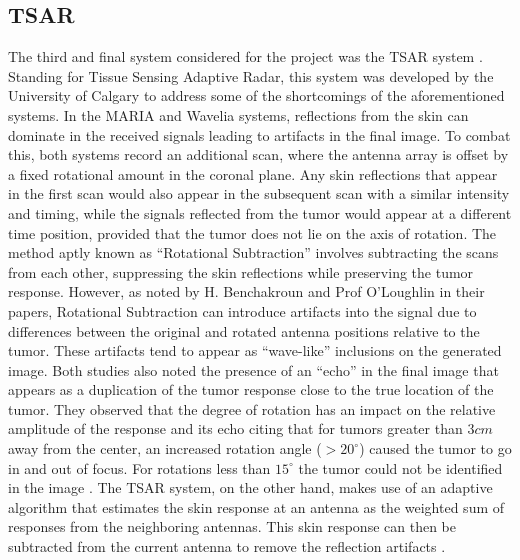 \subsection{TSAR}
The third and final system considered for the project was the TSAR system \cite{e.c.fearMicrowaveBreastImaging2013}.
Standing for Tissue Sensing Adaptive Radar, this system was developed by the University of Calgary to address some of
the shortcomings of the aforementioned systems. In the MARIA and Wavelia systems, reflections from the skin can dominate
in the received signals leading to artifacts in the final image. To combat this, both systems record an additional scan,
where the antenna array is offset by a fixed rotational amount in the coronal plane. Any skin reflections that appear in
the first scan would also appear in the subsequent scan with a similar intensity and timing, while the signals reflected
from the tumor would appear at a different time position, provided that the tumor does not lie on the axis of rotation.
The method aptly known as ``Rotational Subtraction'' involves subtracting the scans from each other, suppressing the skin
reflections while preserving the tumor response. However, as noted by H. Benchakroun and Prof O'Loughlin in their
papers, Rotational Subtraction can introduce artifacts into the signal due to differences between the original and
rotated antenna positions relative to the tumor. These artifacts tend to appear as ``wave-like'' inclusions on the
generated image. Both studies also noted the presence of an ``echo'' in the final image that appears as a duplication of
the tumor response close to the true location of the tumor. They observed that the degree of rotation has an impact on
the relative amplitude of the response and its echo citing that for tumors greater than $3cm$ away from the center, an
increased rotation angle ($ > 20^{\circ}$) caused the tumor to go in and out of focus. For rotations less than
$15^{\circ}$ the tumor could not be identified in the image \cite{h.benchakrounImpactRotationalArtefact2021,
d.oloughlinRotationalArtefactRemoval2020}. The TSAR system, on the other hand, makes use of an adaptive
algorithm that estimates the skin response at an antenna as the weighted sum of responses from the
neighboring antennas. This skin response can then be subtracted from the current antenna to remove the reflection
artifacts \cite{makladNeighborhoodBasedAlgorithmFacilitate2012}. \hfill \break

